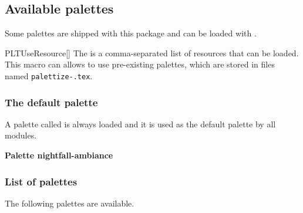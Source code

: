 \documentclass[a4paper, 11pt]{article}
\begin{document}
\subsection{Available palettes}\label{sec:available-palettes}

Some palettes are shipped with this package and can be loaded with .

\begin{macro}{PLTUseResource}[]
    The  is a comma-separated list of resources that can be loaded. This macro can allows to use pre-existing palettes, which are stored in files named \texttt{palettize-.tex}.
\end{macro}

\begin{latexcode}
\end{latexcode}

\subsubsection*{The default palette}

A palette called  is always loaded and it is used as the default palette by all modules.

\begin{tcolorbox}[width = 0.5\linewidth]
    \textbf{Palette nightfall-ambiance}\medskip\par
    \par
\end{tcolorbox}%


\subsubsection*{List of palettes}

The following palettes are available.
\end{document}

